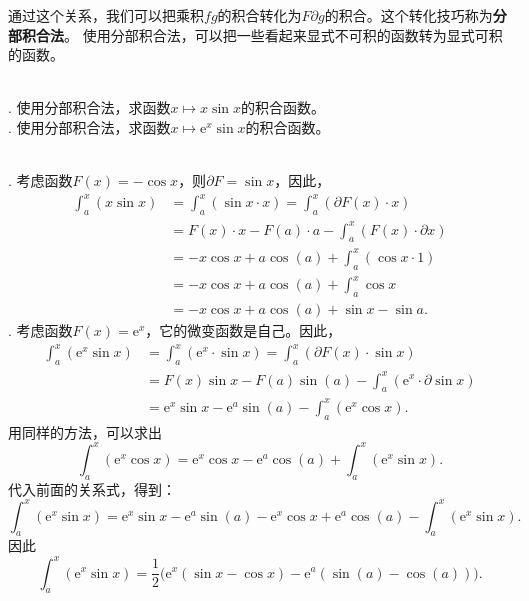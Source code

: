 \documentclass[12pt,UTF8]{ctexbook}
\begin{document}
通过这个关系，我们可以把乘积$fg$的积合转化为$F\partial g$的积合。这个转化技巧称为\textbf{分部积合法}。
使用分部积合法，可以把一些看起来显式不可积的函数转为显式可积的函数。

\begin{et}
    \mbox{} \\
    . 使用分部积合法，求函数$x\mapsto x \sin{x}$的积合函数。\\
    . 使用分部积合法，求函数$x\mapsto \mathrm{e}^x \sin{x}$的积合函数。\\
\end{et}

\begin{so}    
    \mbox{} \\
    . 考虑函数$F(x) = -\cos{x}$，则$\partial F = \sin{x}$，因此，
    \begin{align*}
        \int_a^x (x\sin{x}) &= \int_a^x (\sin{x}\cdot x) = \int_a^x (\partial F(x) \cdot x) \\
        &= F(x)\cdot x - F(a)\cdot a - \int_a^x (F(x) \cdot \partial x) \\
        &= -x\cos{x} + a\cos(a) + \int_a^x (\cos{x} \cdot 1) \\
        &= -x\cos{x} + a\cos(a) + \int_a^x \cos{x} \\
        &= -x\cos{x} + a\cos(a) + \sin{x} - \sin{a}.
    \end{align*}
    . 考虑函数$F(x) = \mathrm{e}^x$，它的微变函数是自己。因此，
    \begin{align*}
        \int_a^x \left(\mathrm{e}^{x} \sin{x}\right) &= \int_a^x \left(\mathrm{e}^x\cdot \sin{x}\right) = \int_a^x \left(\partial F(x) \cdot \sin{x}\right) \\
        &= F(x)\sin{x} - F(a)\sin(a) - \int_a^x \left(\mathrm{e}^{x} \cdot \partial \sin{x}\right) \\
        &= \mathrm{e}^x\sin{x} - \mathrm{e}^a\sin(a) - \int_a^x \left(\mathrm{e}^x \cos{x}\right) .
    \end{align*}
    用同样的方法，可以求出
    $$  \int_a^x \left(\mathrm{e}^x \cos{x}\right) = \mathrm{e}^x\cos{x} - \mathrm{e}^a\cos(a) + \int_a^x \left(\mathrm{e}^{x} \sin{x}\right). $$
    代入前面的关系式，得到：
    $$ \int_a^x \left(\mathrm{e}^{x} \sin{x}\right) = \mathrm{e}^x\sin{x} - \mathrm{e}^a\sin(a) - \mathrm{e}^x\cos{x} + \mathrm{e}^a\cos(a) - \int_a^x \left(\mathrm{e}^{x} \sin{x}\right). $$
    因此
    $$ \int_a^x \left(\mathrm{e}^{x} \sin{x}\right) = \frac{1}{2}\big(\mathrm{e}^x(\sin{x} - \cos{x}) - \mathrm{e}^a(\sin(a) - \cos(a))\big).$$
\end{so}
\end{document}

